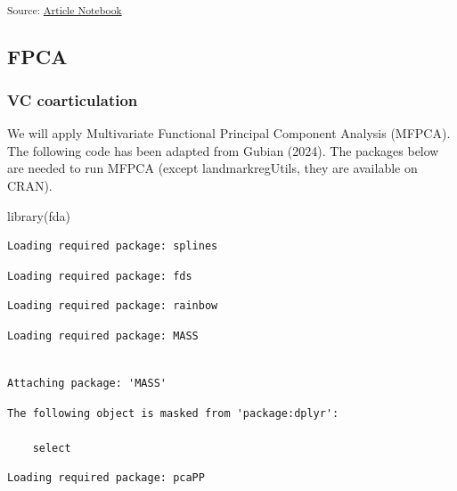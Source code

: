 \documentclass[
]{interact}
\newenvironment{Shaded}{\begin{snugshade}}{\end{snugshade}}
\newcommand{\FunctionTok}[1]{\textcolor[rgb]{0.28,0.35,0.67}{#1}}
\newcommand{\NormalTok}[1]{\textcolor[rgb]{0.00,0.23,0.31}{#1}}
\begin{document}
\textsubscript{Source:
\href{https://stefanocoretta.github.io/mv_uti/index.qmd.html}{Article
Notebook}}

\subsection{FPCA}\label{fpca}

\subsubsection{VC coarticulation}\label{vc-coarticulation-1}

We will apply Multivariate Functional Principal Component Analysis
(MFPCA). The following code has been adapted from Gubian (2024). The
packages below are needed to run MFPCA (except landmarkregUtils, they
are available on CRAN).

\begin{Shaded}
\begin{Highlighting}[]
\FunctionTok{library}\NormalTok{(fda)}
\end{Highlighting}
\end{Shaded}

\begin{verbatim}
Loading required package: splines
\end{verbatim}

\begin{verbatim}
Loading required package: fds
\end{verbatim}

\begin{verbatim}
Loading required package: rainbow
\end{verbatim}

\begin{verbatim}
Loading required package: MASS
\end{verbatim}

\begin{verbatim}

Attaching package: 'MASS'
\end{verbatim}

\begin{verbatim}
The following object is masked from 'package:dplyr':

    select
\end{verbatim}

\begin{verbatim}
Loading required package: pcaPP
\end{verbatim}
\end{document}
